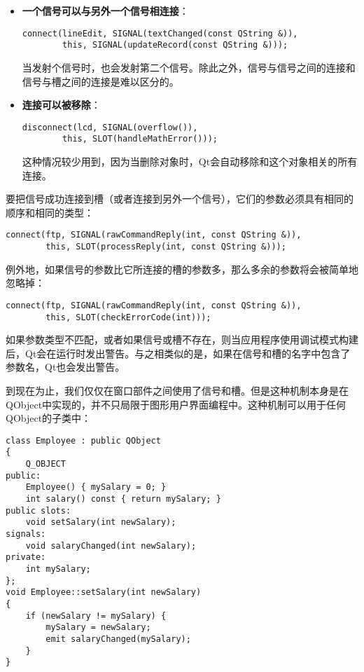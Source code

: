\documentclass[11pt,oneside]{book}
\begin{document}
\begin{common-format}
\begin{itemize}
无论发射的是哪一个信号，都会调用这个槽。

\item \textbf{一个信号可以与另外一个信号相连接}：

\begin{Verbatim}
connect(lineEdit, SIGNAL(textChanged(const QString &)),
        this, SIGNAL(updateRecord(const QString &)));
\end{Verbatim}

当发射个信号时，也会发射第二个信号。除此之外，信号与信号之间的连接和信号与槽之间的连接是难以区分的。

\item \textbf{连接可以被移除}：
\begin{Verbatim}
disconnect(lcd, SIGNAL(overflow()),
        this, SLOT(handleMathError()));
\end{Verbatim}

这种情况较少用到，因为当删除对象时，Qt会自动移除和这个对象相关的所有连接。
\end{itemize}

要把信号成功连接到槽（或者连接到另外一个信号），它们的参数必须具有相同的顺序和相同的类型：
\begin{Verbatim}
connect(ftp, SIGNAL(rawCommandReply(int, const QString &)),
        this, SLOT(processReply(int, const QString &)));
\end{Verbatim}

例外地，如果信号的参数比它所连接的槽的参数多，那么多余的参数将会被简单地忽略掉：
\begin{Verbatim}
connect(ftp, SIGNAL(rawCommandReply(int, const QString &)),
        this, SLOT(checkErrorCode(int)));
\end{Verbatim}

如果参数类型不匹配，或者如果信号或槽不存在，则当应用程序使用调试模式构建后，Qt会在运行时发出警告。与之相类似的是，如果在信号和槽的名字中包含了参数名，Qt也会发出警告。

到现在为止，我们仅仅在窗口部件之间使用了信号和槽。但是这种机制本身是在QObject中实现的，并不只局限于图形用户界面编程中。这种机制可以用于任何QObject的子类中：

\begin{Verbatim}
class Employee : public QObject
{
    Q_OBJECT
public:
    Employee() { mySalary = 0; }
    int salary() const { return mySalary; }
public slots:
    void setSalary(int newSalary);
signals:
    void salaryChanged(int newSalary);
private:
    int mySalary;
};
void Employee::setSalary(int newSalary)
{
    if (newSalary != mySalary) {
        mySalary = newSalary;
        emit salaryChanged(mySalary);
    }
}
\end{Verbatim}


\end{common-format}
\end{document}
